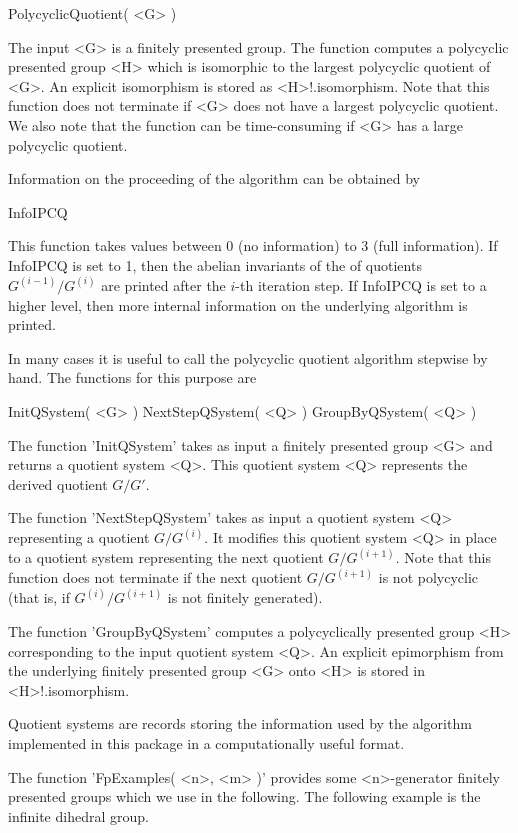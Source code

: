 \> PolycyclicQuotient( <G> )

The input <G> is a finitely presented group. The function computes a 
polycyclic presented group <H> which is isomorphic to the largest polycyclic 
quotient of <G>. An explicit isomorphism is stored as <H>!.isomorphism.
Note that this function does not terminate if <G> does not have a largest
polycyclic quotient. We also note that the function can be time-consuming
if <G> has a large polycyclic quotient.

Information on the proceeding of the algorithm can be obtained by 

\> InfoIPCQ

This function takes values between 0 (no information) to 3 (full information).
If InfoIPCQ is set to 1, then the abelian invariants of the of quotients 
$G^{(i-1)}/G^{(i)}$ are printed after the $i$-th iteration step. If InfoIPCQ 
is set to a higher level, then more internal information on the underlying 
algorithm is printed. 


In many cases it is useful to call the polycyclic quotient algorithm stepwise
by hand. The functions for this purpose are 

\> InitQSystem( <G> )
\> NextStepQSystem( <Q> )
\> GroupByQSystem( <Q> )

The function 'InitQSystem' takes as input a finitely presented group <G>
and returns a quotient system <Q>. This quotient system <Q> represents the
derived quotient $G/G'$. 

The function 'NextStepQSystem' takes as input a quotient system <Q> 
representing a quotient $G/G^{(i)}$. It modifies this quotient system <Q>
in place to a quotient system representing the next quotient $G/G^{(i+1)}$. 
Note that this function does not terminate if the next quotient $G/G^{(i+1)}$
is not polycyclic (that is, if $G^{(i)}/G^{(i+1)}$ is not finitely generated).

The function 'GroupByQSystem' computes a polycyclically presented group <H>
corresponding to the input quotient system <Q>. An explicit epimorphism from
the underlying finitely presented group <G> onto <H> is stored in 
<H>!.isomorphism.

Quotient systems are records storing the information used by the algorithm
implemented in this package in a computationally useful format. 


The function 'FpExamples( <n>, <m> )' provides some <n>-generator finitely
presented groups which we use in the following. The following example is
the infinite dihedral group.

